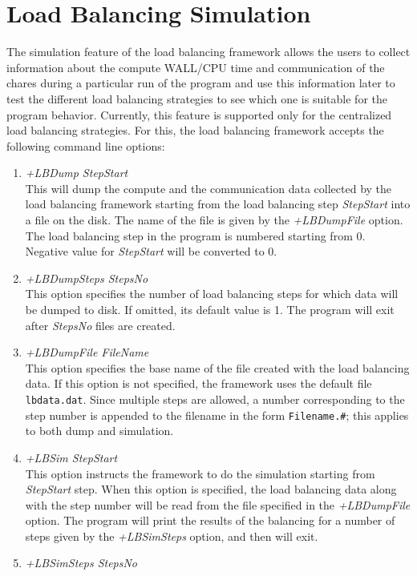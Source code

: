 \section{Load Balancing Simulation}

The simulation feature of the load balancing framework allows the users to collect information
about the compute WALL/CPU time and communication of the chares during a particular run of
the program and use this information later to test the different load balancing strategies to
see which one is suitable for the program behavior. Currently, this feature is supported only for
the centralized load balancing strategies. For this, the load balancing framework
accepts the following command line options:
\begin{enumerate}
\item {\em +LBDump StepStart}\\
        This will dump the compute and the communication data collected by the load balancing framework
	starting from the load balancing step {\em StepStart} into a file on the disk. The name of the file
	is given by the {\em +LBDumpFile} option. The load balancing step in the
  program is numbered starting from 0. Negative value for {\em StepStart} will be converted to 0.
\item {\em +LBDumpSteps StepsNo}\\
        This option specifies the number of load balancing steps for which data will be dumped to disk.
        If omitted, its default value is 1. The program will exit after {\em StepsNo} files are created.
\item {\em +LBDumpFile FileName}\\
        This option specifies the base name of the file created with the load balancing data. If this
	option is not specified, the framework uses the default file {\tt lbdata.dat}. Since multiple steps are allowed,
	a number corresponding to the step number is appended to the filename in the form {\tt Filename.\#};
  this applies to both dump and simulation.
\item {\em +LBSim StepStart}\\
	This option instructs the framework to do the simulation starting from {\em StepStart} step.
	When this option is specified, the load balancing data along with the step
  number will be read from the file specified in the {\em +LBDumpFile}
	option. The program will print the results of the balancing for a number of steps given
  by the {\em +LBSimSteps} option, and then will exit.
\item {\em +LBSimSteps StepsNo}\\

\end{enumerate}
